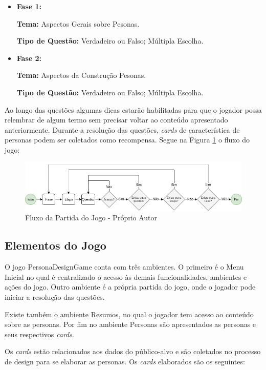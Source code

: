 \begin{itemize}
    \item \textbf{Fase 1:}
    
    \textbf{Tema:} Aspectos Gerais sobre Pesonas.
    
    \textbf{Tipo de Questão:} Verdadeiro ou Falso; Múltipla Escolha.
    
    \item  \textbf{Fase 2:} 
    
    \textbf{Tema:} Aspectos da Construção Pesonas.
    
    \textbf{Tipo de Questão:} Verdadeiro ou Falso; Múltipla Escolha.
    
\end{itemize}

Ao longo das questões algumas dicas estarão habilitadas para que o jogador possa relembrar de algum termo sem precisar voltar ao conteúdo apresentado anteriormente. Durante a resolução das questões, \textit{cards} de característica de personas podem ser coletados como recompensa. Segue na Figura \ref{Fig:game_flow.png} o fluxo do jogo:

\begin{figure}[htbp]
	\centering
		\includegraphics[keepaspectratio=true,scale=0.56]{figuras/game_flow.png}
		\caption{Fluxo da Partida do Jogo - Próprio Autor}
	\label{Fig:game_flow.png}
\end{figure}

\subsection{Elementos do Jogo}

O jogo PersonaDesignGame conta com três ambientes. O primeiro é o Menu Inicial no qual é centralizado o acesso às demais funcionalidades, ambientes e ações do jogo. Outro ambiente é a própria partida do jogo, onde o jogador pode iniciar a resolução das questões.

Existe também o ambiente Resumos, no qual o jogador tem acesso ao conteúdo sobre as personas. Por fim no ambiente Personas são apresentados as personas e seus respectivos \textit{cards}.

Os \textit{cards} estão relacionados aos dados do público-alvo e são coletados no processo de design para se elaborar as personas. Os \textit{cards} elaborados são os seguintes:

